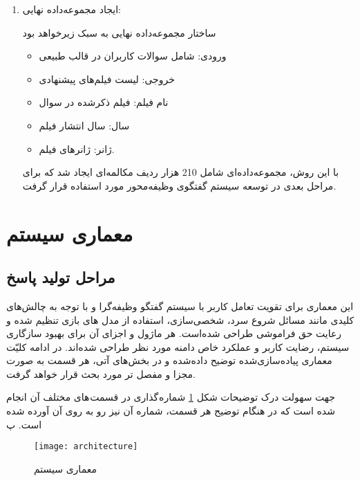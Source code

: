 \begin{enumerate}
\item
ایجاد مجموعه‌داده نهایی: 

ساختار مجموعه‌داده نهایی به سبک زیرخواهد بود
\begin{itemize}
\item
ورودی: شامل سوالات کاربران در قالب طبیعی
\item
خروجی: لیست فیلم‌های پیشنهادی
\item
نام فیلم: فیلم ذکر‌شده در سوال
\item
سال: سال انتشار فیلم
\item
ژانر: ژانرهای فیلم.

\end{itemize}

با این روش، مجموعه‌داده‌ای شامل 210 هزار ردیف مکالمه‌ای ایجاد شد که برای مراحل بعدی در توسعه سیستم گفتگوی وظیفه‌محور مورد استفاده قرار گرفت.


\end{enumerate}

\section{معماری سیستم}
\label{sec:architecture}
\subsection{مراحل تولید پاسخ}

این معماری برای تقویت تعامل کاربر با سیستم گفتگو وظیفه‌گرا و با  توجه به چالش‌های کلیدی مانند مسائل شروع سرد، شخصی‌سازی، استفاده از مدل های بازی تنظیم شده و رعایت حق فراموشی طراحی شده‌است. هر ماژول و اجزای آن برای بهبود سازگاری سیستم، رضایت کاربر و عملکرد خاص دامنه مورد نظر طراحی شده‌اند. در ادامه کلیّت معماری پیاده‌سازی‌شده توضیح داده‌شده و در بخش‌های آتی، هر قسمت به صورت مجزا و مفصل تر مورد بحث قرار خواهد گرفت.

جهت سهولت درک توضیحات شکل%
\ref{fig:architecture}
شماره گذاری در قسمت های مختلف آن انجام شده است که در هنگام توضیح هر قسمت، شماره آن نیز رو به روی آن آورده شده است.
پ

\begin{figure}[ht]
	\centerline{\texttt{[image: architecture]}}
	\caption{معماری سیستم}
	\label{fig:architecture}
\end{figure}


